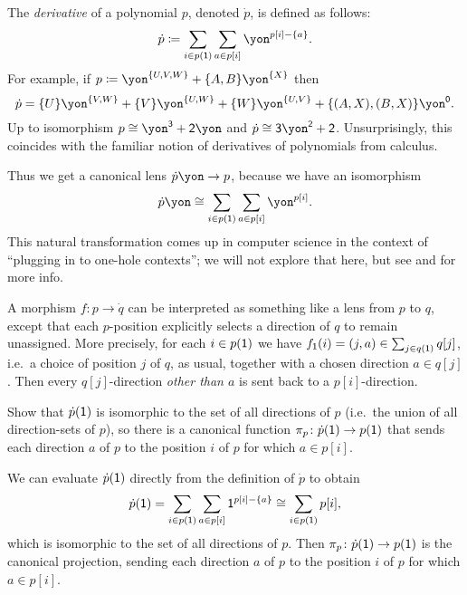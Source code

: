 \documentclass[Book-Poly]{subfiles}
\begin{document}
\begin{example}[Derivatives]\label{ex.derivatives}
The \emph{derivative} of a polynomial $p$, denoted $\dot{p}$, is defined as follows:
\[
\dot{p}\coloneqq\sum_{i\in p(\1)}\sum_{a\in p[i]}\yon^{p[i]-\{a\}}.
\]
For example, if $p\coloneq\yon^{\{U,V,W\}}+\{A,B\}\yon^{\{X\}}$ then
\[\dot{p}=\{U\}\yon^{\{V,W\}}+\{V\}\yon^{\{U,W\}}+\{W\}\yon^{\{U,V\}}+\{(A,X),(B,X)\}\yon^\0.\]
Up to isomorphism $p\cong\yon^\3+\2\yon$ and $\dot{p}\cong\3\yon^\2+\2$.
Unsurprisingly, this coincides with the familiar notion of derivatives of polynomials from calculus.

Thus we get a canonical lens $\dot{p}\yon\to p$, because we have an isomorphism
\[
\dot{p}\yon\cong\sum_{i\in p(\1)}\sum_{a\in p[i]}\yon^{p[i]}.
\]
This natural transformation comes up in computer science in the context of ``plugging in to one-hole contexts''; we will not explore that here, but see \cite{mcbride2001derivative} and \cite{abbott2003derivatives} for more info.%

A morphism $f\colon p\to \dot{q}$ can be interpreted as something like a lens from $p$ to $q$, except that each $p$-position explicitly selects a direction of $q$ to remain unassigned. More precisely, for each $i\in p(\textsf{1})$ we have $f_{\textsf{1}}(i)=(j,a)\in \sum_{j\in q(\textsf{1})}q[j]$, i.e.\ a choice of position $j$ of $q$, as usual, together with a chosen direction $a\in q[j]$. Then every $q[j]$-direction \emph{other than $a$} is sent back to a $p[i]$-direction.
\end{example}

\begin{exercise} \label{exc.deriv_directions}
Show that $\dot{p}(\textsf{1})$ is isomorphic to the set of all directions of $p$ (i.e.\ the union of all direction-sets of $p$), so there is a canonical function $\pi_p \colon \dot{p}(\textsf{1}) \to p(\textsf{1})$ that sends each direction $a$ of $p$ to the position $i$ of $p$ for which $a \in p[i]$.
\begin{solution}
We can evaluate $\dot{p}(\textsf{1})$ directly from the definition of $\dot{p}$ to obtain
\[
    \dot{p}(\textsf{1}) = \sum_{i \in p(\textsf{1})} \sum_{a \in p[i]} \textsf{1}^{p[i]-\{a\}} \cong \sum_{i \in p(\textsf{1})} p[i],
\]
which is isomorphic to the set of all directions of $p$.
Then $\pi_p \colon \dot{p}(\textsf{1}) \to p(\textsf{1})$ is the canonical projection, sending each direction $a$ of $p$ to the position $i$ of $p$ for which $a \in p[i]$.
\end{solution}
\end{exercise}
\end{document}
